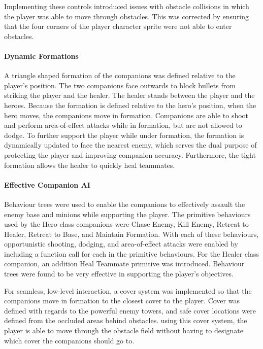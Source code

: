 \documentclass[11pt]{article}
\begin{document}
Implementing these controls introduced issues with obstacle collisions in which the player was able to move through obstacles. This was corrected by ensuring that the four corners of the player character sprite were not able to enter obstacles.

\paragraph{Dynamic Formations}
A triangle shaped formation of the companions was defined relative to the player's position. The two companions face outwards to block bullets from striking the player and the healer. The healer stands between the player and the heroes. Because the formation is defined relative to the hero's position, when the hero moves, the companions move in formation. Companions are able to shoot and perform area-of-effect attacks while in formation, but are not allowed to dodge. To further support the player while under formation, the formation is dynamically updated to face the nearest enemy, which serves the dual purpose of protecting the player and improving companion accuracy. Furthermore, the tight formation allows the healer to quickly heal teammates.

\paragraph{Effective Companion AI}
Behaviour trees were used to enable the companions to effectively assault the enemy base and minions while supporting the player. The primitive behaviours used by the Hero class companions were Chase Enemy, Kill Enemy, Retreat to Healer, Retreat to Base, and Maintain Formation. With each of these behaviours, opportunistic shooting, dodging, and area-of-effect attacks were enabled by including a function call for each in the primitive behaviours. For the Healer class companion, an addition Heal Teammate primitive was introduced. Behaviour trees were found to be very effective in supporting the player's objectives.

For seamless, low-level interaction, a cover system was implemented so that the companions move in formation to the closest cover to the player. Cover was defined with regards to the powerful enemy towers, and safe cover locations were defined from the occluded areas behind obstacles. using this cover system, the player is able to move through the obstacle field without having to designate which cover the companions should go to.
\end{document}
